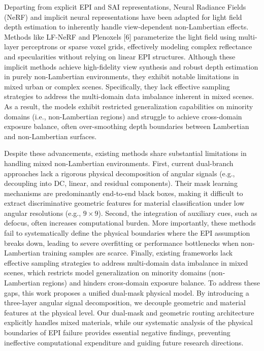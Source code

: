 Departing from explicit EPI and SAI representations, Neural Radiance Fields (NeRF) and implicit neural representations have been adapted for light field depth estimation to inherently handle view-dependent non-Lambertian effects. Methods like LF-NeRF and Plenoxels [6] parameterize the light field using multi-layer perceptrons or sparse voxel grids, effectively modeling complex reflectance and specularities without relying on linear EPI structures. Although these implicit methods achieve high-fidelity view synthesis and robust depth estimation in purely non-Lambertian environments, they exhibit notable limitations in mixed urban or complex scenes. Specifically, they lack effective sampling strategies to address the multi-domain data imbalance inherent in mixed scenes. As a result, the models exhibit restricted generalization capabilities on minority domains (i.e., non-Lambertian regions) and struggle to achieve cross-domain exposure balance, often over-smoothing depth boundaries between Lambertian and non-Lambertian surfaces.

Despite these advancements, existing methods share substantial limitations in handling mixed non-Lambertian environments. First, current dual-branch approaches lack a rigorous physical decomposition of angular signals (e.g., decoupling into DC, linear, and residual components). Their mask learning mechanisms are predominantly end-to-end black boxes, making it difficult to extract discriminative geometric features for material classification under low angular resolutions (e.g., $9 \times 9$). Second, the integration of auxiliary cues, such as defocus, often increases computational burden. More importantly, these methods fail to systematically define the physical boundaries where the EPI assumption breaks down, leading to severe overfitting or performance bottlenecks when non-Lambertian training samples are scarce. Finally, existing frameworks lack effective sampling strategies to address multi-domain data imbalance in mixed scenes, which restricts model generalization on minority domains (non-Lambertian regions) and hinders cross-domain exposure balance. To address these gaps, this work proposes a unified dual-mask physical model. By introducing a three-layer angular signal decomposition, we decouple geometric and material features at the physical level. Our dual-mask and geometric routing architecture explicitly handles mixed materials, while our systematic analysis of the physical boundaries of EPI failure provides essential negative findings, preventing ineffective computational expenditure and guiding future research directions.

